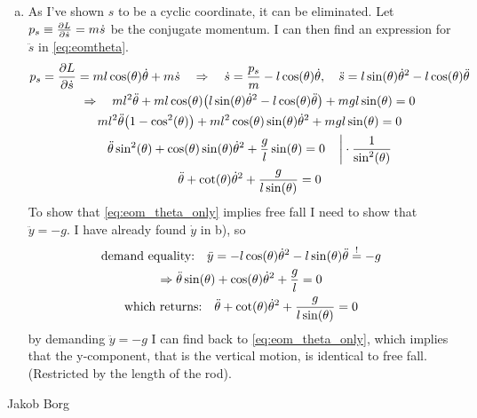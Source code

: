 \documentclass[11pt,a4paper]{report}
\newcounter{excount}[chapter]
\newenvironment{exercise}[1][]{\addtocounter{excount}{1} \noindent {\bf Problem
    \arabic{excount} \ \ #1}\hspace{2mm}}{\vspace{4mm}}
\newenvironment{solution}
    {\begin{tcolorbox}[title=Solution,halign lower=right,breakable]
    }
    {
    \tcblower Jakob Borg
    \end{tcolorbox}
	\vspace{5mm}
    }
\newcommand{\Lpdv}[1]
{
\pdv{L}{#1}
}
\newcommand{\dtheta}
{
\dot{\theta}
}
\newcommand{\ddtheta}
{
\ddot{\theta}
}
\newcommand{\cost}
{
\cos(\theta)
}
\newcommand{\sint}
{
\sin(\theta)
}
\begin{document}
\begin{exercise}
\begin{solution}
\begin{enumerate}[a)]
\item As I've shown $s$ to be a cyclic coordinate, it can be eliminated. Let $p_s \equiv \Lpdv{\dot{s}} = m\dot{s}$ be the conjugate momentum. I can then find an expression for $\ddot{s}$ in \cref{eq:eomtheta}.
\begin{gather}
p_s = \Lpdv{\dot{s}} = ml\cos(\theta)\dtheta + m\dot{s} \quad \Rightarrow \quad \dot{s} = \frac{p_s}{m}- l\cos(\theta)\dtheta \qc \ddot{s} = l\sin(\theta)\dtheta^2 -l\cos(\theta)\ddot{\theta}\notag
\\
\Rightarrow \quad  ml^2\ddot{\theta} + ml\cos(\theta)\qty(l\sint \dtheta^2 - l \cost \ddtheta) + mgl\sint = 0\notag
\\
ml^2 \ddtheta \qty(1-\cos[2](\theta))+  ml^2 \cost \sint \dtheta^2 + mgl \sint = 0\notag
\\
\ddtheta\sin[2](\theta) + \cost \sint \dtheta^2 + \frac{g}{l}\sint = 0 \quad \eval \cdot \frac{1}{\sin[2](\theta)}\notag
\\
\ddtheta + \cot(\theta) \dtheta^2 + \frac{g}{l\sint} = 0 \label{eq:eom_theta_only}
\end{gather}
To show that \cref{eq:eom_theta_only} implies free fall I need to show that $\ddot{y} = -g$. I have already found $\dot{y}$ in b), so
\begin{gather*}
\qq*{demand equality:}\ddot{y} = -l\cost \dtheta^2 - l\sint \ddtheta \overset{!}{=} -g
\\
\Rightarrow \ddtheta \sint + \cost \dtheta^2 + \frac{g}{l} = 0
\\
\qq*{which returns:} \ddtheta + \cot(\theta)\dtheta^2 + \frac{g}{l\sint} = 0
\end{gather*}
by demanding $\ddot{y} = -g$ I can find back to \cref{eq:eom_theta_only}, which implies that the y-component, that is the vertical motion, is identical to free fall. (Restricted by the length of the rod).
\end{enumerate}


\end{solution}
\end{exercise}
\end{document}

